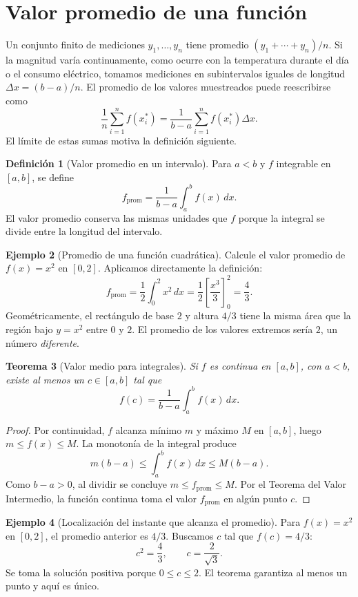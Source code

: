 \documentclass[12pt]{article}
\newtheorem{teorema}{Teorema}[section]
\theoremstyle{definition}
\newtheorem{definicion}[teorema]{Definición}
\newtheorem{ejemplo}[teorema]{Ejemplo}
\theoremstyle{remark}
\begin{document}
\section{Valor promedio de una función}
Un conjunto finito de mediciones $y_1,\ldots,y_n$ tiene promedio $(y_1+\cdots+y_n)/n$. Si la magnitud varía continuamente, como ocurre con la temperatura durante el día o el consumo eléctrico, tomamos mediciones en subintervalos iguales de longitud $\Delta x=(b-a)/n$. El promedio de los valores muestreados puede reescribirse como
\[
\frac1n\sum_{i=1}^n f(x_i^*)
=\frac1{b-a}\sum_{i=1}^n f(x_i^*)\Delta x.
\]
El límite de estas sumas motiva la definición siguiente.
\begin{definicion}[Valor promedio en un intervalo]
Para $a<b$ y $f$ integrable en $[a,b]$, se define
\[
\boxed{f_{\mathrm{prom}}=\frac1{b-a}\int_a^b f(x)\,dx.}
\]
El valor promedio conserva las mismas unidades que $f$ porque la integral se divide entre la longitud del intervalo.
\end{definicion}
\begin{ejemplo}[Promedio de una función cuadrática]
Calcule el valor promedio de $f(x)=x^2$ en $[0,2]$. Aplicamos directamente la definición:
\[
f_{\mathrm{prom}}=\frac12\int_0^2x^2\,dx
=\frac12\left[\frac{x^3}{3}\right]_0^2
=\boxed{\frac43}.
\]
Geométricamente, el rectángulo de base $2$ y altura $4/3$ tiene la misma área que la región bajo $y=x^2$ entre $0$ y $2$. El promedio de los valores extremos sería $2$, un número \emph{diferente}.
\end{ejemplo}
\begin{teorema}[Valor medio para integrales]
Si $f$ es continua en $[a,b]$, con $a<b$, existe al menos un $c\in[a,b]$ tal que
\[
\boxed{f(c)=\frac1{b-a}\int_a^b f(x)\,dx.}
\]
\end{teorema}
\begin{proof}
Por continuidad, $f$ alcanza mínimo $m$ y máximo $M$ en $[a,b]$, luego $m\le f(x)\le M$. La monotonía de la integral produce
\[
m(b-a)\le\int_a^b f(x)\,dx\le M(b-a).
\]
Como $b-a>0$, al dividir se concluye $m\le f_{\mathrm{prom}}\le M$. Por el Teorema del Valor Intermedio, la función continua toma el valor $f_{\mathrm{prom}}$ en algún punto $c$.
\end{proof}
\begin{ejemplo}[Localización del instante que alcanza el promedio]
Para $f(x)=x^2$ en $[0,2]$, el promedio anterior es $4/3$. Buscamos $c$ tal que $f(c)=4/3$:
\[
c^2=\frac43,\qquad c=\boxed{\frac2{\sqrt3}}.
\]
Se toma la solución positiva porque $0\le c\le2$. El teorema garantiza al menos un punto y aquí es único.
\end{ejemplo}
\end{document}
